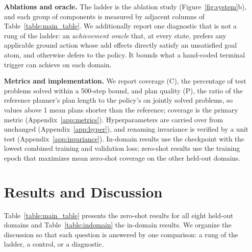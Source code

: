 \documentclass{article} %
\begin{document}
\textbf{Ablations and oracle.} The ladder is the ablation study
(Figure~\ref{fig:system}b), and each group of components is measured by
adjacent columns of Table~\ref{table:main_table}. We additionally report
one diagnostic that is not a rung of the ladder: an \emph{achievement
oracle} that, at every state, prefers any applicable ground action whose
add effects directly satisfy an unsatisfied goal atom, and otherwise defers
to the policy. It bounds what a hand-coded terminal trigger can achieve on
each domain.

\textbf{Metrics and implementation.} We report coverage (C), the
percentage of test problems solved within a 500-step bound, and
plan quality (P), the ratio of the reference planner's plan length to the
policy's on jointly solved problems, so values above 1 mean plans shorter
than the reference; coverage is the primary metric
(Appendix~\ref{app:metrics}). Hyperparameters are carried over from
\citet{gabar} unchanged (Appendix~\ref{app:hyper}), and renaming invariance
is verified by a unit test (Appendix~\ref{app:invariance}). In-domain
results use the checkpoint with the lowest combined training and validation
loss; zero-shot results use the training epoch that maximizes mean
zero-shot coverage on the other held-out domains.

\section{Results and Discussion}

Table~\ref{table:main_table} presents the zero-shot results for all eight
held-out domains and Table~\ref{table:indomain} the in-domain results. We
organize the discussion so that each question is answered by one
comparison: a rung of the ladder, a control, or a diagnostic.
\end{document}
